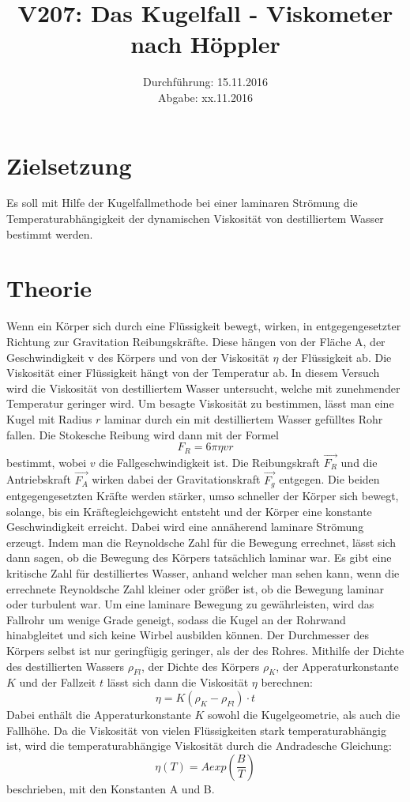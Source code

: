 \documentclass[titlepage=firstiscover, bibliography=totoc, captions=tableheading]{scrartcl}
\title{V207: Das Kugelfall - Viskometer nach Höppler}
\author{
  Simon Schulte
  \texorpdfstring{
    \\
    \href{mailto:simon.schulte@udo.edu}{simon.schulte@udo.edu}
  }{}
  \texorpdfstring{\and}{, }
  Tim Sedlaczek
  \texorpdfstring{
    \\
    \href{mailto:tim.sedlaczek@udo.edu}{tim.sedlaczek@udo.edu}
  }{}
}
\date{Durchführung: 15.11.2016\\
      Abgabe: xx.11.2016}
\begin{document}
\maketitle
\thispagestyle{empty}
\tableofcontents
\newpage
\section{Zielsetzung}
\label{sec:zielsetzung}
Es soll mit Hilfe der Kugelfallmethode bei einer laminaren Strömung die
Temperaturabhängigkeit der dynamischen Viskosität von destilliertem Wasser
bestimmt werden.
\section{Theorie}
\label{sec:theorie}
Wenn ein Körper sich durch eine Flüssigkeit bewegt, wirken, in entgegengesetzter
Richtung zur Gravitation Reibungskräfte. Diese hängen von der Fläche A, der Geschwindigkeit v
des Körpers und von der Viskosität $\eta$ der Flüssigkeit ab. Die Viskosität
einer Flüssigkeit hängt von der Temperatur ab. In diesem Versuch wird die
Viskosität von destilliertem Wasser untersucht, welche mit zunehmender
Temperatur geringer wird. Um besagte Viskosität zu bestimmen, lässt man eine
Kugel mit Radius $r$ laminar durch ein mit destilliertem Wasser gefülltes Rohr
fallen. Die Stokesche Reibung wird dann mit der Formel
\begin{equation}
  F_R = 6 \pi \eta v r
\end{equation}
bestimmt, wobei $v$ die Fallgeschwindigkeit ist. Die Reibungskraft $\vec{F_R}$
und die Antriebskraft $\vec{F_A}$ wirken dabei der Gravitationskraft $\vec{F_g}$
entgegen. Die beiden entgegengesetzten Kräfte werden stärker, umso schneller
der Körper sich bewegt, solange, bis ein Kräftegleichgewicht entsteht und der
Körper eine konstante Geschwindigkeit erreicht. Dabei wird eine annäherend
laminare Strömung erzeugt. Indem man die Reynoldsche Zahl für die Bewegung
errechnet, lässt sich dann sagen, ob die Bewegung des Körpers tatsächlich
laminar war. Es gibt eine kritische Zahl für destilliertes Wasser, anhand
welcher man sehen kann, wenn die errechnete Reynoldsche Zahl kleiner oder größer
ist, ob die Bewegung laminar oder turbulent war. Um eine laminare Bewegung zu
gewährleisten, wird das Fallrohr um wenige Grade geneigt, sodass die Kugel an der
Rohrwand hinabgleitet und sich keine Wirbel ausbilden können. Der Durchmesser
des Körpers selbst ist nur geringfügig geringer, als der des Rohres. Mithilfe
der Dichte des destillierten Wassers $\rho_{Fl}$, der Dichte des Körpers $\rho_K$,
der Apperaturkonstante $K$ und der Fallzeit $t$ lässt sich dann die Viskosität
$\eta$ berechnen:
\begin{equation}
  \eta = K (\rho_K - \rho_{Fl}) \cdot t
\end{equation}
Dabei enthält die Apperaturkonstante $K$ sowohl die Kugelgeometrie, als auch
die Fallhöhe. Da die Viskosität von vielen Flüssigkeiten stark
temperaturabhängig ist, wird die temperaturabhängige Viskosität durch die
Andradesche Gleichung:
\begin{equation}
  \eta(T) = A exp (\frac{B}{T})
\end{equation}
beschrieben, mit den Konstanten A und B.
\end{document}
